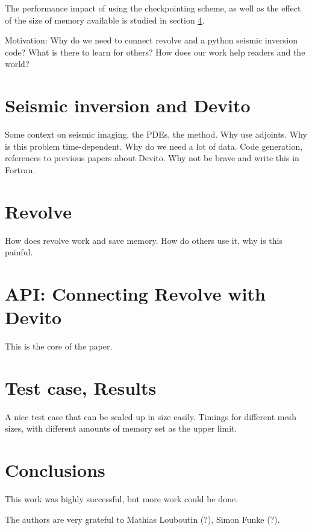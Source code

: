 \documentclass[sigconf]{acmart}
\begin{document}
The performance impact of using the checkpointing scheme, as well as
the effect of the size of memory available is studied in section
\ref{sec:experiment}. 

Motivation: Why do we need to connect revolve and a python seismic inversion code? What is there to learn for others? How does our work help readers and the world?

\section{Seismic inversion and Devito}
\label{sec:inversion_devito}
Some context on seismic imaging, the PDEs, the method. Why use
adjoints. Why is this problem time-dependent. Why do we need a lot of
data.
Code generation, references to previous papers about Devito. Why not
be brave and write this in Fortran.

\section{Revolve}
\label{sec:revolve}
How does revolve work and save memory. How do others use it, why is this painful.

\section{API: Connecting Revolve with Devito}
\label{sec:api}
This is the core of the paper.

\section{Test case, Results}
\label{sec:experiment}
A nice test case that can be scaled up in size easily. Timings for different mesh sizes, with different amounts of memory set as the upper limit.

\section{Conclusions}
This work was highly successful, but more work could be done.

\begin{acks}
  The authors are very grateful to Mathias Louboutin (?), Simon Funke
  (?). 
\end{acks}



 
\end{document}
